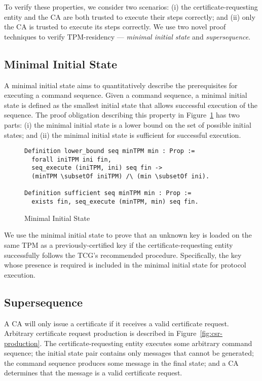 \documentclass[runningheads]{llncs}
\begin{document}
To verify these properties, we consider two scenarios: (i) the
certificate-requesting entity and the CA are both trusted to execute
their steps correctly; and (ii) only the CA is trusted to execute its
steps correctly. We use two novel proof techniques to verify
TPM-residency --- \emph{minimal initial state} and
\emph{supersequence}.

\subsection{Minimal Initial State}

A minimal initial state aims to quantitatively describe the
prerequisites for executing a command sequence.  Given a command
sequence, a minimal initial state is defined as the smallest initial
state that allows successful execution of the sequence. The proof
obligation describing this property in
Figure~\ref{fig:minimal-initial-state} has two parts: (i) the minimal
initial state is a lower bound on the set of possible initial states;
and (ii) the minimal initial state is sufficient for successful
execution. 

\begin{figure}[hbtp]
\begin{lstlisting}[language=Coq]
Definition lower_bound seq minTPM min : Prop :=
  forall iniTPM ini fin,
  seq_execute (iniTPM, ini) seq fin ->
  (minTPM \subsetOf iniTPM) /\ (min \subsetOf ini).

Definition sufficient seq minTPM min : Prop :=
  exists fin, seq_execute (minTPM, min) seq fin.
\end{lstlisting}
\caption{Minimal Initial State}
\label{fig:minimal-initial-state}
\end{figure}

We use the minimal initial state to prove that an unknown key is
loaded on the same TPM as a previously-certified key if the
certificate-requesting entity successfully follows the TCG's
recommended procedure.  Specifically, the key whose presence is
required is included in the minimal initial state for protocol
execution.

\subsection{Supersequence}

A CA will only issue a certificate if it receives a valid certificate
request.  Arbitrary certificate request production is described in
Figure~\ref{fig:csr-production}. The certificate-requesting
entity executes some arbitrary command sequence; the initial state
pair contains only messages that cannot be generated; the command
sequence produces some message in the final state; and a CA determines
that the message is a valid certificate request.
\end{document}
